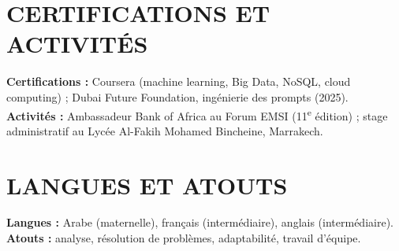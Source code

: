 \documentclass[a4paper,11pt]{article}
\begin{document}
\section{CERTIFICATIONS ET ACTIVITÉS}
\textbf{Certifications :} Coursera (machine learning, Big Data, NoSQL, cloud computing) ; Dubai Future Foundation, ingénierie des prompts (2025).\\[-0.05em]
\textbf{Activités :} Ambassadeur Bank of Africa au Forum EMSI (11\textsuperscript{e} édition) ; stage administratif au Lycée Al-Fakih Mohamed Bincheine, Marrakech.

\section{LANGUES ET ATOUTS}
\textbf{Langues :} Arabe (maternelle), français (intermédiaire), anglais (intermédiaire). \textbf{Atouts :} analyse, résolution de problèmes, adaptabilité, travail d'équipe.
\end{document}

